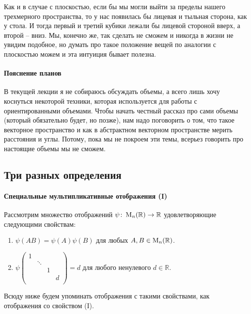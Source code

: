 Как и в случае с плоскостью, если бы мы могли выйти за пределы нашего трехмерного пространства, то у нас появилась бы лицевая и тыльная сторона, как у стола.
И тогда первый и третий кубики лежали бы лицевой стороной вверх, а второй -- вниз.
Мы, конечно же, так сделать не сможем и никогда в жизни не увидим подобное, но думать про такое положение вещей по аналогии с плоскостью можем и эта интуиция бывает полезна.

\paragraph{Пояснение планов}

В текущей лекции я не собираюсь обсуждать объемы, а всего лишь хочу коснуться некоторой техники, которая используется для работы с ориентированными объемами.
Чтобы начать честный рассказ про сами объемы (который обязательно будет, но позже), нам надо поговорить о том, что такое векторное пространство и как в абстрактном векторном пространстве мерить расстояния и углы.
Потому, пока мы не покроем эти темы, всерьез говорить про настоящие объемы мы не сможем.

\subsection{Три разных определения}

\paragraph{Специальные мультипликативные отображения (I)} 

Рассмотрим множество отображений $\psi\colon \operatorname{M}_{n}(\mathbb R)\to \mathbb R$ удовлетворяющие следующими свойствам:
\begin{enumerate}
\item $\psi(AB) = \psi(A)\psi(B)$ для любых $A,B\in\operatorname{M}_{n}(\mathbb R)$.

\item 
$
\psi
\begin{pmatrix}
{1}&{}&{}&{}\\
{}&{\ddots}&{}&{}\\
{}&{}&{1}&{}\\
{}&{}&{}&{d}\\
\end{pmatrix}
= 
d
$ для любого ненулевого $d\in\mathbb R$.
\end{enumerate}
Всюду ниже будем упоминать отображения с такими свойствами, как отображения со свойством (I).

